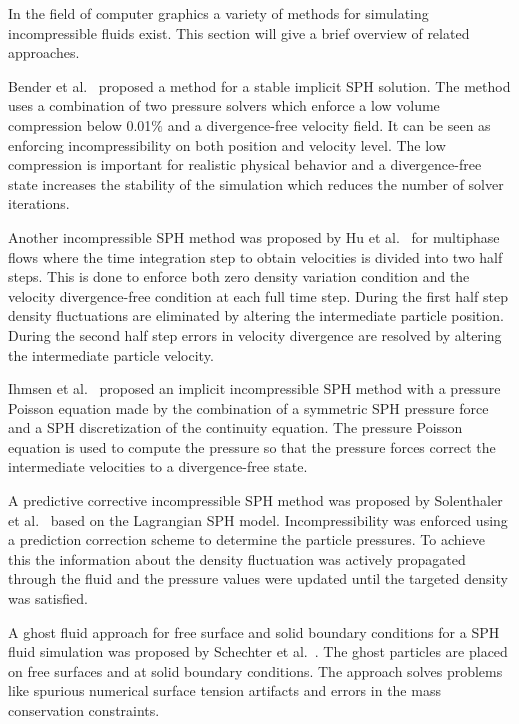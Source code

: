     In the field of computer graphics a variety of methods for simulating incompressible fluids exist.
    This section will give a brief overview of related approaches.

    Bender et al.~\cite{bender} proposed a method for a stable implicit SPH solution.
    The method uses a combination of two pressure solvers which enforce a low volume compression below 0.01$\%$ and a divergence-free velocity field.
    It can be seen as enforcing incompressibility on both position and velocity level.
    The low compression is important for realistic physical behavior and a divergence-free state increases the stability of the simulation which reduces the number of solver iterations.

    Another incompressible SPH method was proposed by Hu et al.~\cite{hu} for multiphase flows where the time integration step to obtain velocities is divided into two half steps.
    This is done to enforce both zero density variation condition and the velocity divergence-free condition at each full time step.
    During the first half step density fluctuations are eliminated by altering the intermediate particle position.
    During the second half step errors in velocity divergence are resolved by altering the intermediate particle velocity.

    Ihmsen et al.~\cite{ihmsen2014implicit} proposed an implicit incompressible SPH method with a pressure Poisson equation made by the combination of a symmetric SPH pressure force and a SPH discretization of the continuity equation.
    The pressure Poisson equation is used to compute the pressure so that the pressure forces correct the intermediate velocities to a divergence-free state.
    
    A predictive corrective incompressible SPH method was proposed by Solenthaler et al.~\cite{solenthaler} based on the Lagrangian SPH model.
    Incompressibility was enforced using a prediction correction scheme to determine the particle pressures.
    To achieve this the information about the density fluctuation was actively propagated through the fluid and the pressure values were updated until the targeted density was satisfied.

    A ghost fluid approach for free surface and solid boundary conditions for a SPH fluid simulation was proposed by Schechter et al.~\cite{ghost}.
    The ghost particles are placed on free surfaces and at solid boundary conditions.
    The approach solves problems like spurious numerical surface tension artifacts and errors in the mass conservation constraints.


